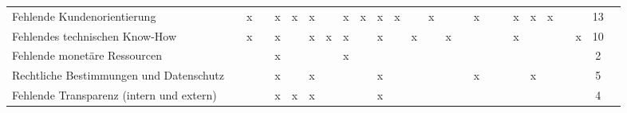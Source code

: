 \begin{sidewaystable}[ht]
\begin{tabular}{|p{6.5cm}|c|c|c|c|c|c|c|c|c|c|c|c|c|c|c|c|c|c|c|c|c|c|c|c|c|}
		Fehlende Kundenorientierung                     &                   & x                  &                    & x                    & x                  & x                 &                   & x                    & x                  & x                    & x                &                  & x                   &                  &                 & x                    &                    &                 & x                & x                & x                      &                      &                        & 13 \\
		Fehlendes technischen Know-How                  &                   & x                  &                    & x                    &                    & x                 & x                 & x                    &                    & x                    &                  & x                &                     & x                &                 &                      &                    &                 & x                &                  &                        &                      & x                      & 10 \\
		Fehlende monetäre Ressourcen                    &                   &                    &                    & x                    &                    &                   &                   & x                    &                    &                      &                  &                  &                     &                  &                 &                      &                    &                 &                  &                  &                        &                      &                        & 2  \\
		Rechtliche Bestimmungen und Datenschutz         &                   &                    &                    & x                    &                    & x                 &                   &                      &                    & x                    &                  &                  &                     &                  &                 & x                    &                    &                 &                  & x                &                        &                      &                        & 5  \\
		Fehlende Transparenz (intern und extern)        &                   &                    &                    & x                    & x                  & x                 &                   &                      &                    & x                    &                  &                  &                     &                  &                 &                      &                    &                 &                  &                  &                        &                      &                        & 4  \\

\end{tabular}
\end{sidewaystable}

